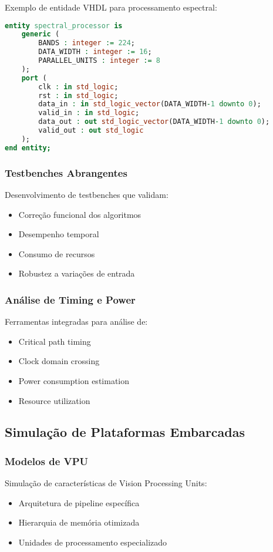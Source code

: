 Exemplo de entidade VHDL para processamento espectral:
\begin{lstlisting}[language=VHDL]
entity spectral_processor is
    generic (
        BANDS : integer := 224;
        DATA_WIDTH : integer := 16;
        PARALLEL_UNITS : integer := 8
    );
    port (
        clk : in std_logic;
        rst : in std_logic;
        data_in : in std_logic_vector(DATA_WIDTH-1 downto 0);
        valid_in : in std_logic;
        data_out : out std_logic_vector(DATA_WIDTH-1 downto 0);
        valid_out : out std_logic
    );
end entity;
\end{lstlisting}

\subsubsection{Testbenches Abrangentes}
Desenvolvimento de testbenches que validam:
\begin{itemize}
    \item Correção funcional dos algoritmos
    \item Desempenho temporal
    \item Consumo de recursos
    \item Robustez a variações de entrada
\end{itemize}

\subsubsection{Análise de Timing e Power}
Ferramentas integradas para análise de:
\begin{itemize}
    \item Critical path timing
    \item Clock domain crossing
    \item Power consumption estimation
    \item Resource utilization
\end{itemize}

\subsection{Simulação de Plataformas Embarcadas}

\subsubsection{Modelos de VPU}
Simulação de características de Vision Processing Units:
\begin{itemize}
    \item Arquitetura de pipeline específica
    \item Hierarquia de memória otimizada
    \item Unidades de processamento especializado
\end{itemize}

